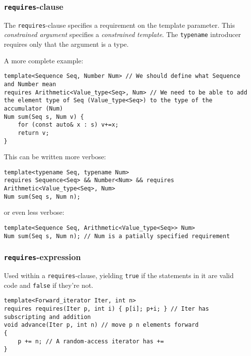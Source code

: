 \documentclass[8pt, table, xcdraw]{article}%
\begin{document}
\subsubsection{\lstinline{requires}-clause}

The \lstinline{requires}-clause specifies a requirement on the template parameter. This \textit{constrained argument} specifies a \textit{constrained template}. The \lstinline{typename} introducer requires only that the argument is a type. 

A more complete example:

\begin{lstlisting}
template<Sequence Seq, Number Num> // We should define what Sequence and Number mean
requires Arithmetic<Value_type<Seq>, Num> // We need to be able to add the element type of Seq (Value_type<Seq>) to the type of the accumulator (Num)
Num sum(Seq s, Num v) {
    for (const auto& x : s) v+=x;
    return v;
}
\end{lstlisting}

This can be written more verbose:

\begin{lstlisting}
template<typename Seq, typename Num>
requires Sequence<Seq> && Number<Num> && requires Arithmetic<Value_type<Seq>, Num>
Num sum(Seq s, Num n);
\end{lstlisting}

or even less verbose:

\begin{lstlisting}
template<Sequence Seq, Arithmetic<Value_type<Seq>> Num>
Num sum(Seq s, Num n); // Num is a patially specified requirement
\end{lstlisting}

\subsubsection{\lstinline{requires}-expression}

Used within a \lstinline{requires}-clause, yielding \lstinline{true} if the statements in it are valid code and \lstinline{false} if they're not.

\begin{lstlisting}
template<Forward_iterator Iter, int n>
requires requires(Iter p, int i) { p[i]; p+i; } // Iter has subscripting and addition
void advance(Iter p, int n) // move p n elements forward
{
    p += n; // A random-access iterator has +=
}
\end{lstlisting}
\end{document}
